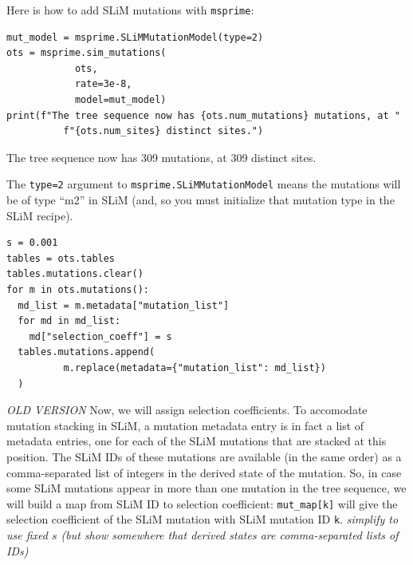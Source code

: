 \documentclass[12pt]{article}
\newcommand{\msprime}[0]{\texttt{msprime}\xspace}
\newcommand{\comment}[1]{\textit{\color{green} #1}}
\begin{document}
Here is how to add SLiM mutations with \msprime :
\begin{listing}[H]
    \begin{verbatim}
mut_model = msprime.SLiMMutationModel(type=2)
ots = msprime.sim_mutations(
            ots,
            rate=3e-8,
            model=mut_model)
print(f"The tree sequence now has {ots.num_mutations} mutations, at "
          f"{ots.num_sites} distinct sites.")
  \end{verbatim}
\end{listing}
\begin{pycon}
The tree sequence now has 309 mutations, at 309 distinct sites.
\end{pycon}
The \verb|type=2| argument to \verb|msprime.SLiMMutationModel|
means the mutations will be of type ``m2'' in SLiM
(and, so you must initialize that mutation type in the SLiM recipe).

\begin{listing}[H]
    \begin{verbatim}
s = 0.001
tables = ots.tables
tables.mutations.clear()
for m in ots.mutations():
  md_list = m.metadata["mutation_list"]
  for md in md_list:
    md["selection_coeff"] = s
  tables.mutations.append(
          m.replace(metadata={"mutation_list": md_list})
  )
  \end{verbatim}
\end{listing}


\comment{OLD VERSION}
Now, we will assign selection coefficients.
To accomodate mutation stacking in SLiM,
a mutation metadata entry is in fact a list of metadata entries,
one for each of the SLiM mutations that are stacked at this position.
The SLiM IDs of these mutations are available (in the same order)
as a comma-separated list of integers in the derived state of the mutation.
So, in case some SLiM mutations appear in more than one mutation in the tree sequence,
we will build a map from SLiM ID to selection coefficient:
\verb|mut_map[k]| will give the selection coefficient of the SLiM mutation
with SLiM mutation ID \verb|k|.
\comment{simplify to use fixed $s$ (but show somewhere that derived states are comma-separated lists of IDs)}
\end{document}
